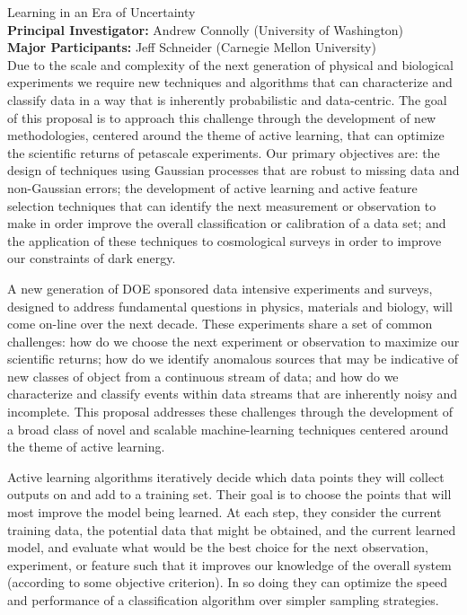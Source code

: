 \documentclass[useAMS,usenatbib,tightenlines,11pt,preprint]{aastex}
\begin{document}
 

  Learning in an Era of Uncertainty \\
{\bf Principal Investigator: } Andrew Connolly (University of Washington)\\
{\bf Major Participants: }  Jeff Schneider (Carnegie Mellon University) \\

 Due to the scale and complexity of
the next generation of physical and biological experiments we require
new techniques and algorithms that can characterize and classify data
in a way that is inherently probabilistic and data-centric.  The goal
of this proposal is to approach this challenge through the development of
new methodologies, centered around the theme of active learning, that
can optimize the scientific returns of petascale experiments. Our
primary objectives are: the design of techniques using Gaussian
processes that are robust to missing data and non-Gaussian errors; the
development of active learning and active feature selection techniques
that can identify the next measurement or observation to make in order 
improve the overall classification or calibration of a data set; and the application
of these techniques to cosmological surveys in order to improve our
constraints of dark energy.

 A new generation of DOE sponsored
data intensive experiments and surveys, designed to address
fundamental questions in physics, materials and biology, will come
on-line over the next decade. These experiments share a set of common
challenges: how do we choose the next experiment or observation to
maximize our scientific returns; how do we identify anomalous
sources that may be indicative of new classes of object from a
continuous stream of data; and how do we characterize and classify
events within data streams that are inherently noisy and
incomplete. This proposal addresses these challenges through the
development of a broad class of novel and scalable machine-learning
techniques centered around the theme of active learning.

Active learning algorithms iteratively decide which data points they
will collect outputs on and add to a training set.  Their goal is to
choose the points that will most improve the model being learned.  At
each step, they consider the current training data, the potential data
that might be obtained, and the current learned model, and evaluate
what would be the best choice for the next observation, experiment, or
feature such that it improves our knowledge of the overall system
(according to some objective criterion).  In so doing they can
optimize the speed and performance of a classification algorithm over
simpler sampling strategies.
\end{document}
